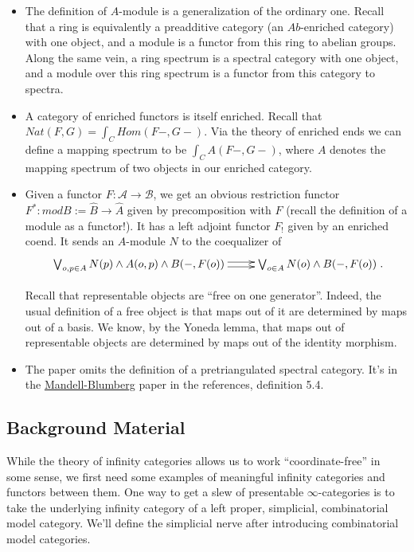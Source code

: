 \documentclass[letterpaper]{article}
\theoremstyle{definition}
\newcommand{\mc}{\mathcal}
\begin{document}
\begin{itemize}
\item The definition of $A$-module is a generalization of the ordinary
  one. Recall that a ring is equivalently a preadditive category (an
  $Ab$-enriched category) with
  one object, and a module is a functor from this ring to abelian
  groups. Along the same vein, a ring spectrum is a spectral category with
  one object, and a module over this ring spectrum is a functor from
  this category to spectra.
\item A category of enriched functors is itself enriched. Recall that
  $Nat(F,G) = \int_C Hom(F-,G-)$. Via the theory of enriched ends we
  can define a mapping spectrum to be $\int_C A(F-,G-)$, where $A$
  denotes the mapping spectrum of two objects in our enriched
  category.
\item Given a functor $F : \mc A \rightarrow \mc B$, we get an obvious
  restriction functor $F^* : mod B := \widehat B \rightarrow \widehat A$
  given by precomposition with $F$ (recall the definition of a module
  as a functor!). It has a left adjoint functor $F_!$  given by an enriched
  coend. It sends an $A$-module $N$ to the coequalizer of
\[
\xymatrix{\bigvee_{o,p \in A} N(p) \wedge A(o,p) \wedge B(-,{F(o)})
  \ar@<.5ex>[r] \ar@<-.5ex>[r] & \bigvee_{o \in A} N(o) \wedge B(-,F(o))}.
\]

Recall that representable objects are ``free on one
generator''. Indeed, the usual definition of a free object is that
maps out of it are determined by maps out of a basis. We know, by the
Yoneda lemma, that maps out of representable objects are determined by
maps out of the identity morphism.

\item The paper omits the definition of a pretriangulated spectral
  category. It's in the
  \href{References/LocalizationTHH.pdf}{Mandell-Blumberg} paper in the
  references, definition 5.4.
\end{itemize}

\subsection{Background Material}

While the theory of infinity categories allows us to work
``coordinate-free'' in some sense, we first need some examples of
meaningful infinity categories and functors between them. One way to
get a slew of presentable $\infty$-categories is to take the underlying
infinity category of a left proper, simplicial, combinatorial model
category. We'll define the simplicial nerve after introducing
combinatorial model categories.
\end{document}
